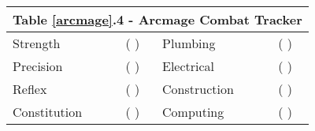 \documentclass[a4paper]{article}
\begin{document}
\begin{tabular}{|l l l l|}
\toprule
\multicolumn{4}{|c|}{Table \ref{arcmage}.4 - Arcmage Combat Tracker} \\
\midrule
Strength & \hspace{1cm} ( \hspace{0.5cm} ) & Plumbing & \hspace{1cm} ( \hspace{0.5cm} ) \\
Precision & \hspace{1cm} ( \hspace{0.5cm} ) & Electrical & \hspace{1cm} ( \hspace{0.5cm} ) \\ 
Reflex & \hspace{1cm} ( \hspace{0.5cm} ) & Construction & \hspace{1cm} ( \hspace{0.5cm} ) \\
Constitution & \hspace{1cm} ( \hspace{0.5cm} ) & Computing & \hspace{1cm} ( \hspace{0.5cm} ) \\
\end{tabular}
\end{document}
